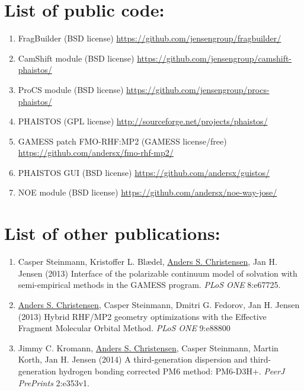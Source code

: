 \section*{List of public code:}
\begin{enumerate}
    \item FragBuilder (BSD license) \url{https://github.com/jensengroup/fragbuilder/}
    \item CamShift module (BSD license) \url{https://github.com/jensengroup/camshift-phaistos/}
    \item ProCS module (BSD license) \url{https://github.com/jensengroup/procs-phaistos/}
    \item PHAISTOS (GPL license) \url{http://sourceforge.net/projects/phaistos/}
    \item GAMESS patch FMO-RHF:MP2 (GAMESS license/free) \url{https://github.com/andersx/fmo-rhf-mp2/}
    \item PHAISTOS GUI (BSD license) \url{https://github.com/andersx/guistos/}
    \item NOE module (BSD license) \url{https://github.com/andersx/noe-way-jose/}
\end{enumerate}
\clearpage
\section*{List of other publications:}
\begin{enumerate}
    \item Casper Steinmann, Kristoffer L. Blædel, \underline{Anders S. Christensen}, Jan H. Jensen (2013) Interface of the polarizable continuum model of solvation with semi-empirical methods in the GAMESS program. \textit{PLoS ONE} 8:e67725.
    \item \underline{Anders S. Christensen}, Casper Steinmann, Dmitri G. Fedorov, Jan H. Jensen (2013) Hybrid RHF/MP2 geometry optimizations with the Effective Fragment Molecular Orbital Method. \textit{PLoS ONE} 9:e88800
    \item Jimmy C. Kromann, \underline{Anders S. Christensen}, Casper Steinmann, Martin Korth, Jan H. Jensen (2014) A third-generation dispersion and third-generation hydrogen bonding corrected PM6 method: PM6-D3H+. \textit{PeerJ PrePrints} 2:e353v1.
\end{enumerate}


